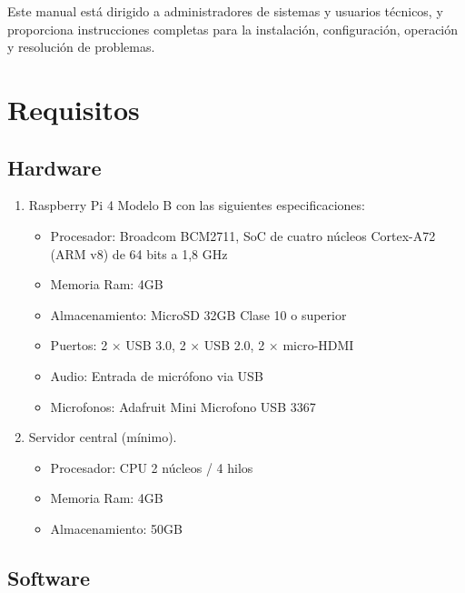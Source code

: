 Este manual está dirigido a administradores de sistemas y usuarios técnicos, y proporciona instrucciones completas para la instalación, configuración, operación y resolución de problemas.

\section*{Requisitos}

\subsection*{Hardware}

\begin{enumerate}
  \item Raspberry Pi 4 Modelo B con las siguientes especificaciones:
        \begin{itemize}
          \item Procesador: Broadcom BCM2711, SoC de cuatro núcleos Cortex-A72 (ARM v8) de 64 bits a 1,8 GHz
          \item Memoria Ram: 4GB
          \item Almacenamiento: MicroSD 32GB Clase 10 o superior
          \item Puertos: 2 × USB 3.0, 2 × USB 2.0, 2 × micro-HDMI
          \item Audio: Entrada de micrófono via USB
          \item Microfonos: Adafruit Mini Microfono USB 3367
        \end{itemize}
  \item Servidor central (mínimo).
        \begin{itemize}
          \item Procesador: CPU 2 núcleos / 4 hilos
          \item Memoria Ram: 4GB
          \item Almacenamiento: 50GB
        \end{itemize}
\end{enumerate}

\subsection*{Software}

